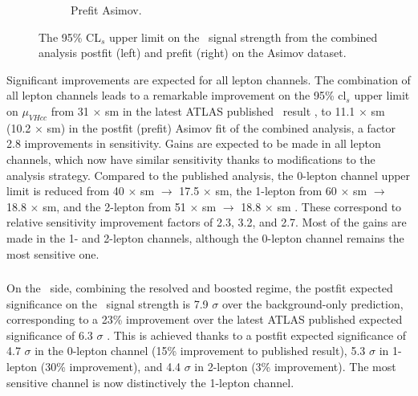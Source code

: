 \begin{figure}[h!]
\begin{subfigure}[b]{0.48\textwidth}
      \caption{Prefit Asimov.}
      \label{fig:fit_new_vhcclimitPrefit}
  \end{subfigure}
    \caption{The 95\% CL$_s$ upper limit on the \vhc\ signal strength from the combined analysis postfit (left) and prefit (right) on the Asimov dataset.}
    \label{fig:fit_vhcc_limits}
\end{figure} 

Significant improvements are expected for all lepton channels. The combination of all lepton channels leads to a remarkable improvement on the 95\% \gls{cl}$_s$ upper limit on $\mu_{VHcc}$ from 31 $\times$ \gls{sm} in the latest ATLAS published \vhc\ result \cite{Collaboration:2721696}, to 11.1 $\times$ \gls{sm} (10.2 $\times$ \gls{sm}) in the postfit (prefit) Asimov fit of the combined analysis, a factor 2.8 improvements in sensitivity. Gains are expected to be made in all lepton channels, which now have similar sensitivity thanks to modifications to the analysis strategy. Compared to the published analysis, the 0-lepton channel upper limit is reduced from 40 $\times$ \gls{sm} $\rightarrow$ 17.5 $\times$ \gls{sm}, the 1-lepton from 60 $\times$ \gls{sm} $\rightarrow$ 18.8 $\times$ \gls{sm}, and the 2-lepton from 51 $\times$ \gls{sm} $\rightarrow$ 18.8 $\times$ \gls{sm} \cite{Collaboration:2721696}. These correspond to relative sensitivity improvement factors of 2.3, 3.2, and 2.7. Most of the gains are made in the 1- and 2-lepton channels, although the 0-lepton channel remains the most sensitive one.

\subsubsection{\boldvhb}
On the \vhb\ side, combining the resolved and boosted regime, the postfit expected significance on the \vhb\ signal strength is 7.9 $\sigma$ over the background-only prediction, corresponding to a 23\% improvement over the latest ATLAS published expected significance of 6.3 $\sigma$ \cite{ATLAS:2021wqh}. This is achieved thanks to a postfit expected significance of 4.7 $\sigma$ in the 0-lepton channel (15\% improvement to published result), 5.3 $\sigma$ in 1-lepton (30\% improvement), and 4.4 $\sigma$ in 2-lepton (3\% improvement). The most sensitive channel is now distinctively the 1-lepton channel. \\

